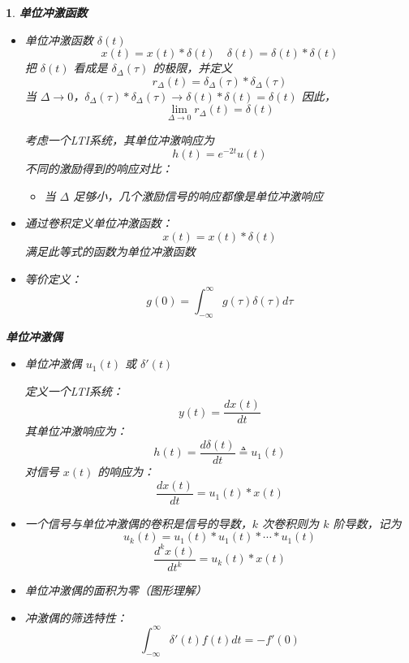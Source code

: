 \documentclass[UTF8]{report}
\theoremstyle{MyLineTheoremStyle} %
\theoremstyle{MyBlockTheoremStyle} %
\theoremstyle{MySubsubsectionStyle} %
\newtheorem{definition}{}
\begin{document}
\begin{definition}
    \textbf{单位冲激函数}
    \begin{itemize}
        \item 单位冲激函数 $\delta(t)$
        \[
        x(t) = x(t) * \delta(t)\quad \delta(t) = \delta(t) * \delta(t)
        \]
        把 $\delta(t)$ 看成是 $\delta_\Delta(\tau)$ 的极限，并定义
        \[
        r_\Delta(t) = \delta_\Delta(\tau) * \delta_\Delta(\tau)
        \]
        当 $\Delta \to 0$，$\delta_\Delta(\tau) * \delta_\Delta(\tau) \to \delta(t) * \delta(t) = \delta(t)$
        因此，
        \[
        \lim_{\Delta \to 0} r_\Delta(t) = \delta(t)
        \]

        考虑一个LTI系统，其单位冲激响应为
        \[
        h(t) = e^{-2t}u(t)
        \]
        不同的激励得到的响应对比：
        \begin{itemize}
            \item 当 $\Delta$ 足够小，几个激励信号的响应都像是单位冲激响应
        \end{itemize}

        \item 通过卷积定义单位冲激函数：
        \[
        x(t) = x(t) * \delta(t)
        \]
        满足此等式的函数为单位冲激函数
        \item 等价定义：
        \[
        g(0) = \int_{-\infty}^{\infty} g(\tau) \delta(\tau) d\tau
        \]
    \end{itemize}

    \textbf{单位冲激偶}
    \begin{itemize}
        \item 单位冲激偶 $u_1(t)$ 或 $\delta'(t)$\par
        定义一个LTI系统：
        \[
        y(t) = \frac{dx(t)}{dt}
        \]
        其单位冲激响应为：
        \[
        h(t) = \frac{d\delta(t)}{dt} \triangleq u_1(t)
        \]
        对信号 $x(t)$ 的响应为：
        \[
        \frac{dx(t)}{dt} = u_1(t) * x(t)
        \]

        \item 一个信号与单位冲激偶的卷积是信号的导数，$k$ 次卷积则为 $k$ 阶导数，记为
        \[
        u_k(t) = u_1(t) * u_1(t) * \cdots * u_1(t)
        \]
        \[
        \frac{d^k x(t)}{dt^k} = u_k(t) * x(t)
        \]
        \item 单位冲激偶的面积为零（图形理解）
        \item 冲激偶的筛选特性：
        \[
        \int_{-\infty}^{\infty} \delta'(t) f(t) dt = -f'(0)
        \]
    \end{itemize}


\end{definition}
\end{document}

